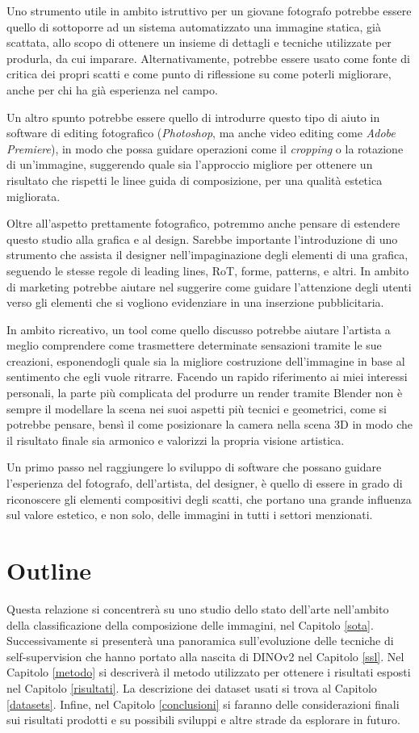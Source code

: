 Uno strumento utile in ambito istruttivo per un giovane fotografo potrebbe essere quello di sottoporre ad un sistema automatizzato una immagine statica, già scattata, allo scopo di ottenere un insieme di dettagli e tecniche utilizzate per produrla, da cui imparare. Alternativamente, potrebbe essere usato come fonte di critica dei propri scatti e come punto di riflessione su come poterli migliorare, anche per chi ha già esperienza nel campo. 

Un altro spunto potrebbe essere quello di introdurre questo tipo di aiuto in software di editing fotografico (\textit{Photoshop}, ma anche video editing come \textit{Adobe Premiere}), in modo che possa guidare operazioni come il \textit{cropping} o la rotazione di un'immagine, suggerendo quale sia l'approccio migliore per ottenere un risultato che rispetti le linee guida di composizione, per una qualità estetica migliorata.   

Oltre all'aspetto prettamente fotografico, potremmo anche pensare di estendere questo studio alla grafica e al design. Sarebbe importante l'introduzione di uno strumento che assista il designer nell'impaginazione degli elementi di una grafica, seguendo le stesse regole di leading lines, RoT, forme, patterns, e altri. In ambito di marketing potrebbe aiutare nel suggerire come guidare l'attenzione degli utenti verso gli elementi che si vogliono evidenziare in una inserzione pubblicitaria. 

In ambito ricreativo, un tool come quello discusso potrebbe aiutare l'artista a meglio comprendere come trasmettere determinate sensazioni tramite le sue creazioni, esponendogli quale sia la migliore costruzione dell'immagine in base al sentimento che egli vuole ritrarre. Facendo un rapido riferimento ai miei interessi personali, la parte più complicata del produrre un render tramite Blender non è sempre il modellare la scena nei suoi aspetti più tecnici e geometrici, come si potrebbe pensare, bensì il come posizionare la camera nella scena 3D in modo che il risultato finale sia armonico e valorizzi la propria visione artistica.

Un primo passo nel raggiungere lo sviluppo di software che possano guidare l'esperienza del fotografo, dell'artista, del designer, è quello di essere in grado di riconoscere gli elementi compositivi degli scatti, che portano una grande influenza sul valore estetico, e non solo, delle immagini in tutti i settori menzionati.

\section{Outline}
Questa relazione si concentrerà su uno studio dello stato dell'arte nell'ambito della classificazione della composizione delle immagini, nel Capitolo \ref{sota}. Successivamente si presenterà una panoramica sull'evoluzione delle tecniche di self-supervision che hanno portato alla nascita di DINOv2 nel Capitolo \ref{ssl}. Nel Capitolo \ref{metodo} si descriverà il metodo utilizzato per ottenere i risultati esposti nel Capitolo \ref{risultati}. La descrizione dei dataset usati si trova al Capitolo \ref{datasets}.
Infine, nel Capitolo \ref{conclusioni} si faranno delle considerazioni finali sui risultati prodotti e su possibili sviluppi e altre strade da esplorare in futuro.